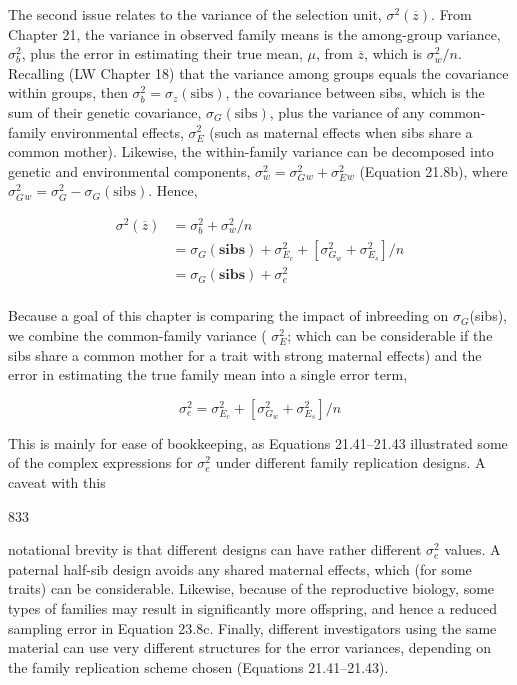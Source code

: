 \documentclass{article}
\begin{document}
The second issue relates to the variance of the selection unit,  $ \sigma^2(\overline{z}) $. From Chapter 21, the variance in observed family means is the among-group variance,  $ \sigma_b^2 $, plus the error in estimating their true mean,  $ \mu $, from  $ \overline{z} $, which is  $ \sigma_w^2/n $. Recalling (LW Chapter 18) that the variance among groups equals the covariance within groups, then  $ \sigma_b^2 = \sigma_z(\text{sibs}) $, the covariance between sibs, which is the sum of their genetic covariance,  $ \sigma_G(\text{sibs}) $, plus the variance of any common-family environmental effects,  $ \sigma_E^2 $ (such as maternal effects when sibs share a common mother). Likewise, the within-family variance can be decomposed into genetic and environmental components,  $ \sigma_w^2 = \sigma_G^2_w + \sigma_E^2_w $ (Equation 21.8b), where  $ \sigma_G^2_w = \sigma_G^2 - \sigma_G(\text{sibs}) $. Hence,

\begin{equation}
\begin{aligned}\sigma^{2}(\overline{z})&=\sigma_{b}^{2}+\sigma_{w}^{2}/n\\&=\sigma_{G}(\mathbf{s i b s})+\sigma_{E_{c}}^{2}+[\sigma_{G_{w}}^{2}+\sigma_{E_{s}}^{2}]/n\\&=\sigma_{G}(\mathbf{s i b s})+\sigma_{e}^{2}\\ \end{aligned}
\tag{23.8b}
\label{eq:23_8b}
\end{equation}

Because a goal of this chapter is comparing the impact of inbreeding on  $ \sigma_G $(sibs), we combine the common-family variance ( $ \sigma_E^2 $; which can be considerable if the sibs share a common mother for a trait with strong maternal effects) and the error in estimating the true family mean into a single error term,

\begin{equation}
\sigma_{e}^{2}=\sigma_{E_{c}}^{2}+[\sigma_{G_{w}}^{2}+\sigma_{E_{s}}^{2}]/n
\tag{23.8c}
\label{eq:23_8c}
\end{equation}

This is mainly for ease of bookkeeping, as Equations 21.41–21.43 illustrated some of the complex expressions for  $ \sigma_{e}^{2} $ under different family replication designs. A caveat with this

833

notational brevity is that different designs can have rather different  $ \sigma_e^2 $ values. A paternal half-sib design avoids any shared maternal effects, which (for some traits) can be considerable. Likewise, because of the reproductive biology, some types of families may result in significantly more offspring, and hence a reduced sampling error in Equation 23.8c. Finally, different investigators using the same material can use very different structures for the error variances, depending on the family replication scheme chosen (Equations 21.41–21.43).
\end{document}
